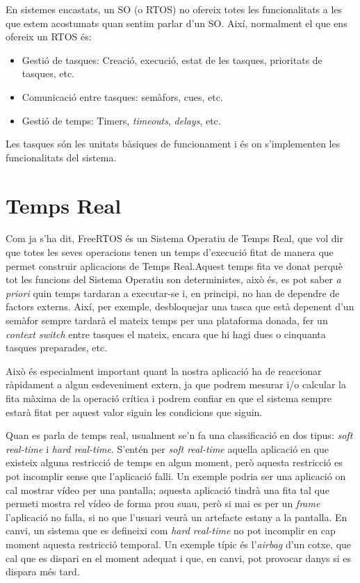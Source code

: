 En sistemes encastats, un SO (o RTOS) no ofereix totes les funcionalitats a les que estem acostumats quan sentim parlar d'un SO. Així, normalment el que ens ofereix un RTOS és:

\begin{itemize}
 \item Gestió de tasques: Creació, execució, estat de les tasques, prioritats de tasques, etc.
 \item Comunicació entre tasques: semàfors, cues, etc.
 \item Gestió de temps: Timers, {\em timeouts}, {\em delays}, etc.
\end{itemize}

Les tasques són les unitats bàsiques de funcionament i és on s'implementen les funcionalitats del sistema.

\section{Temps Real}
Com ja s'ha dit, FreeRTOS és un Sistema Operatiu de Temps Real, que vol dir que totes les seves operacions tenen un temps d'execució fitat de manera que permet construir aplicacions de Temps Real.Aquest temps fita ve donat perquè tot les funcions del Sistema Operatiu son deterministes, això és, es pot saber {\em a priori} quin temps tardaran a executar-se i, en principi, no han de dependre de factors externs. Així, per exemple, desbloquejar una tasca que està depenent d'un semàfor sempre tardarà el mateix temps per una plataforma donada, fer un {\em context switch} entre tasques el mateix, encara que hi hagi dues o cinquanta tasques preparades, etc.

Això és especialment important quant la nostra aplicació ha de reaccionar ràpidament a algun esdeveniment extern, ja que podrem mesurar i/o calcular la fita màxima de la operació crítica i podrem confiar en que el sistema sempre estarà fitat per aquest valor siguin les condicions que siguin.

Quan es parla de temps real, usualment se'n fa una classificació en dos tipus: {\em soft real-time}  i {\em hard real-time}. S'entén per {\em soft real-time} aquella aplicació en que existeix alguna restricció de temps en algun moment, però aquesta restricció es pot incomplir sense que l'aplicació falli. Un exemple podria ser una aplicació  on cal mostrar vídeo per una pantalla; aquesta aplicació tindrà una fita tal que permeti mostra rel vídeo de forma prou suau, però si mai es per un {\em frame} l'aplicació no falla, si no que l'usuari veurà un artefacte estany a la pantalla. En canvi, un sistema que es defineixi com {\em hard real-time} no pot incomplir en cap moment aquesta restricció  temporal. Un exemple típic és l'{\em airbag} d'un cotxe, que cal que es dispari en el moment adequat i que, en canvi, pot provocar danys si es dispara més tard.

